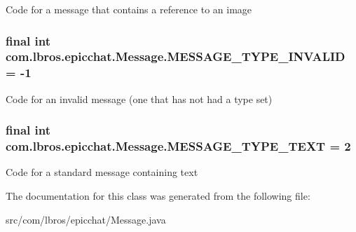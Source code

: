 Code for a message that contains a reference to an image \hypertarget{classcom_1_1lbros_1_1epicchat_1_1_message_a635b4ccc33ba48556636a96b6f1c0c64}{
\subsubsection[{M\-E\-S\-S\-A\-G\-E\-\_\-\-T\-Y\-P\-E\-\_\-\-I\-N\-V\-A\-L\-I\-D}]{\setlength{\rightskip}{0pt plus 5cm}final int com.\-lbros.\-epicchat.\-Message.\-M\-E\-S\-S\-A\-G\-E\-\_\-\-T\-Y\-P\-E\-\_\-\-I\-N\-V\-A\-L\-I\-D = -\/1\hspace{0.3cm}{\ttfamily [static]}}}\label{classcom_1_1lbros_1_1epicchat_1_1_message_a635b4ccc33ba48556636a96b6f1c0c64}
Code for an invalid message (one that has not had a type set) \hypertarget{classcom_1_1lbros_1_1epicchat_1_1_message_a693c7b51c8566b9f0f96f3bf574cabed}{
\subsubsection[{M\-E\-S\-S\-A\-G\-E\-\_\-\-T\-Y\-P\-E\-\_\-\-T\-E\-X\-T}]{\setlength{\rightskip}{0pt plus 5cm}final int com.\-lbros.\-epicchat.\-Message.\-M\-E\-S\-S\-A\-G\-E\-\_\-\-T\-Y\-P\-E\-\_\-\-T\-E\-X\-T = 2\hspace{0.3cm}{\ttfamily [static]}}}\label{classcom_1_1lbros_1_1epicchat_1_1_message_a693c7b51c8566b9f0f96f3bf574cabed}
Code for a standard message containing text 

The documentation for this class was generated from the following file\-:\begin{DoxyCompactItemize}
\item 
src/com/lbros/epicchat/Message.\-java\end{DoxyCompactItemize}
